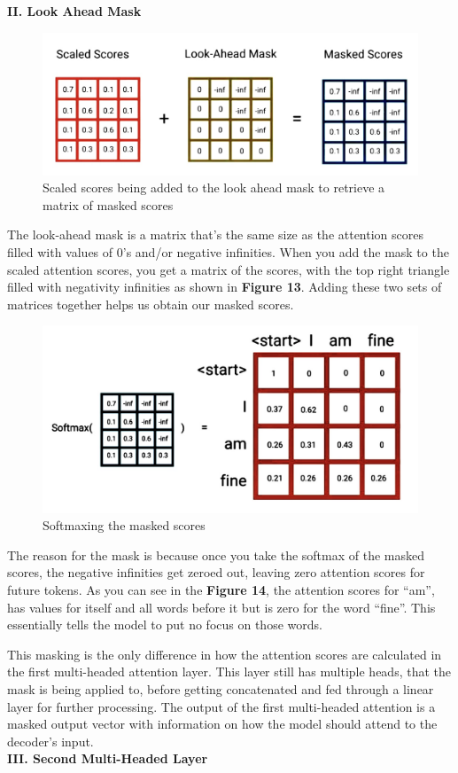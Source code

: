 \noindent
\textbf{II. Look Ahead Mask}

\begin{figure}[H]
\centering
\includegraphics[width=.55\textwidth]{figures/t13.jpg}
\caption{Scaled scores being added to the look ahead mask to retrieve a matrix of masked scores}
\end{figure}

The look-ahead mask is a matrix that’s the same size as the attention scores filled with values of 0’s and/or negative infinities. When you add the mask to the scaled attention scores, you get a matrix of the scores, with the top right triangle filled with negativity infinities as shown in \textbf{Figure 13}. Adding these two sets of matrices together helps us obtain our masked scores.

\begin{figure}[H]
\centering
\includegraphics[width=.3\textwidth]{figures/t14.jpg}
\caption{Softmaxing the masked scores}
\end{figure}
\newpage


The reason for the mask is because once you take the softmax of the masked scores, the negative infinities get zeroed out, leaving zero attention scores for future tokens. As you can see in the \textbf{Figure 14}, the attention scores for “am”, has values for itself and all words before it but is zero for the word “fine”. This essentially tells the model to put no focus on those words.

This masking is the only difference in how the attention scores are calculated in the first multi-headed attention layer. This layer still has multiple heads, that the mask is being applied to, before getting concatenated and fed through a linear layer for further processing. The output of the first multi-headed attention is a masked output vector with information on how the model should attend to the decoder’s input. \\

\noindent
\textbf{III. Second Multi-Headed Layer}

